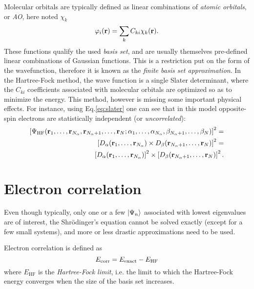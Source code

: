 \documentclass[./thesis.tex]{subfiles}
\begin{document}
Molecular orbitals are typically defined as linear combinations of \emph{atomic orbitals}, or \emph{AO}, here noted $\chi_k$
\begin{equation}
 \varphi_i({\bf r}) = \sum_k C_{ki} \chi_k({\bf r}).
\end{equation}
These functions qualify the used \emph{basis set}, and are usually themselves pre-defined linear combinations of Gaussian functions. This is a restriction put on the form of the wavefunction, therefore it is known as the \emph{finite basis set approximation}.
In the Hartree-Fock method, the wave function is a single Slater determinant, where the $C_{ki}$ coefficients associated with molecular orbitals are optimized so as to minimize the energy. This method, however is missing some important physical effects. For instance, using Eq.\eqref{eq:slater} one can see that in this model opposite-spin electrons are statistically independent (or \emph{uncorrelated}):
\begin{equation}
\begin{split}
\left[ \Psi_\textrm{HF}({\bf r}_1,\dots,{\bf r}_{{N_\alpha}},{\bf r}_{{N_\alpha}+1},\dots,{\bf r}_N;
      \alpha_1,\dots,\alpha_{{N_\alpha}},\beta_{{N_\alpha}+1},\dots,\beta_N) \right]^2 = \\
\left[ D_\alpha({\bf r}_1,\dots,{\bf r}_{{N_\alpha}}) \times D_\beta({\bf r}_{{N_\alpha}+1},\dots,{\bf r}_N) \right]^2 = \\
\left[ D_\alpha({\bf r}_1,\dots,{\bf r}_{{N_\alpha}}) \right]^2 \times \left[ D_\beta({\bf r}_{{N_\alpha}+1},\dots,{\bf r}_N) \right]^2.
\end{split}
\end{equation}

\section{Electron correlation}
Even though typically, only one or a few $\ket{\Psi_n}$ associated with lowest eigenvalues are of interest, the Shrödinger's equation cannot be solved exactly (except for a few small systems), and more or less drastic approximations need to be used. 

Electron correlation is defined as\cite{Lowdin_1959}
\begin{equation}
E_\text{corr} = E_\text{exact} - E_\text{HF}
\end{equation}
where $E_\text{HF}$ is the \emph{Hartree-Fock limit}, i.e. the limit to which the Hartree-Fock energy converges when the size of the basis set increases.
\end{document}
